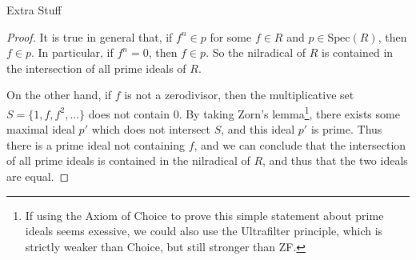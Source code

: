 \documentclass[12pt]{article}
\theoremstyle{definition}
\begin{document}
\begin{section}{Extra Stuff}
\begin{proof}
\par It is true in general that, if $f^n \in p$ for some $f \in R$ and $p \in \text{Spec}(R)$, then $f \in p$. In particular, if $f^n = 0$, then $f \in p$. So the nilradical of $R$ is contained in the intersection of all prime ideals of $R$.
\par On the other hand, if $f$ is not a zerodivisor, then the multiplicative set $S = \{1, f, f^2, ... \}$ does not contain $0$. By taking Zorn's lemma\footnote{
If using the Axiom of Choice to prove this simple statement about prime ideals seems exessive, we could also use the Ultrafilter principle,\cite{ultrafilter} which is strictly weaker than Choice, but still stronger than ZF.

}, there exists some maximal ideal $p'$ which does not intersect $S$, and this ideal $p'$ is prime.\cite{reid} Thus there is a prime ideal not containing $f$, and we can conclude that the intersection of all prime ideals is contained in the nilradical of $R$, and thus that the two ideals are equal.
\end{proof}
\end{section}
\begin{thebibliography}{}
\end{thebibliography}
\end{document}

